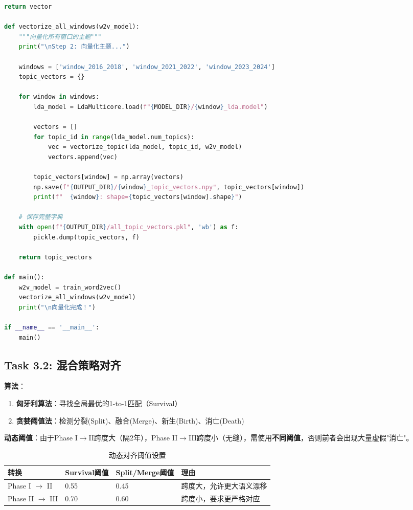\documentclass[12pt, a4paper]{ctexart}
\newenvironment{warning}{%
  \begin{tcolorbox}[colback=red!5, colframe=red!50!black, boxrule=0.5pt, arc=2pt, breakable, title=\textbf{注意}]
}{%
  \end{tcolorbox}
}
\newenvironment{codefile}{%
  \begin{tcolorbox}[colback=gray!5, colframe=gray!50!black, boxrule=0.5pt, arc=0pt, breakable]
}{%
  \end{tcolorbox}
}
\begin{document}
\begin{codefile}
\begin{lstlisting}[language=Python]
    return vector

def vectorize_all_windows(w2v_model):
    """向量化所有窗口的主题"""
    print("\nStep 2: 向量化主题...")

    windows = ['window_2016_2018', 'window_2021_2022', 'window_2023_2024']
    topic_vectors = {}

    for window in windows:
        lda_model = LdaMulticore.load(f"{MODEL_DIR}/{window}_lda.model")

        vectors = []
        for topic_id in range(lda_model.num_topics):
            vec = vectorize_topic(lda_model, topic_id, w2v_model)
            vectors.append(vec)

        topic_vectors[window] = np.array(vectors)
        np.save(f"{OUTPUT_DIR}/{window}_topic_vectors.npy", topic_vectors[window])
        print(f"  {window}: shape={topic_vectors[window].shape}")

    # 保存完整字典
    with open(f"{OUTPUT_DIR}/all_topic_vectors.pkl", 'wb') as f:
        pickle.dump(topic_vectors, f)

    return topic_vectors

def main():
    w2v_model = train_word2vec()
    vectorize_all_windows(w2v_model)
    print("\n向量化完成！")

if __name__ == '__main__':
    main()
\end{lstlisting}
\end{codefile}

\subsection{Task 3.2: 混合策略对齐}

\textbf{算法}：
\begin{enumerate}
    \item \textbf{匈牙利算法}：寻找全局最优的1-to-1匹配（Survival）
    \item \textbf{贪婪阈值法}：检测分裂(Split)、融合(Merge)、新生(Birth)、消亡(Death)
\end{enumerate}

\begin{warning}
\textbf{动态阈值}：由于Phase I$\to$II跨度大（隔2年），Phase II$\to$III跨度小（无缝），需使用\textbf{不同阈值}，否则前者会出现大量虚假"消亡"。
\end{warning}

\begin{table}[h]
\centering
\caption{动态对齐阈值设置}
\begin{tabular}{llll}
\toprule
\textbf{转换} & \textbf{Survival阈值} & \textbf{Split/Merge阈值} & \textbf{理由} \\
\midrule
Phase I $\to$ II & 0.55 & 0.45 & 跨度大，允许更大语义漂移 \\
Phase II $\to$ III & 0.70 & 0.60 & 跨度小，要求更严格对应 \\
\bottomrule
\end{tabular}
\end{table}
\end{document}
